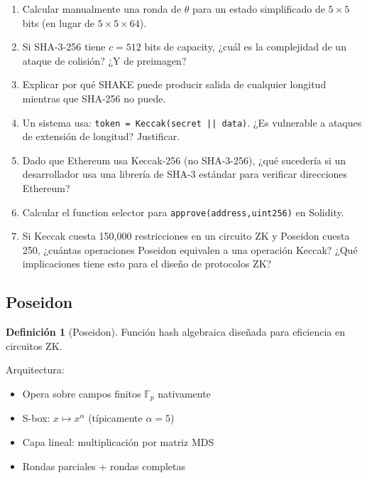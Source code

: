 \documentclass[11pt,a4paper,twoside,openright]{book}
\theoremstyle{definition}
\newtheorem{definition}{Definición}[chapter]
\theoremstyle{plain}
\theoremstyle{remark}
\newcommand{\Fp}{\mathbb{F}_p}
\begin{document}
\begin{enumerate}
    \item Calcular manualmente una ronda de $\theta$ para un estado simplificado de $5 \times 5$ bits (en lugar de $5 \times 5 \times 64$).
    
    \item Si SHA-3-256 tiene $c = 512$ bits de capacity, ¿cuál es la complejidad de un ataque de colisión? ¿Y de preimagen?
    
    \item Explicar por qué SHAKE puede producir salida de cualquier longitud mientras que SHA-256 no puede.
    
    \item Un sistema usa: \texttt{token = Keccak(secret || data)}. ¿Es vulnerable a ataques de extensión de longitud? Justificar.
    
    \item Dado que Ethereum usa Keccak-256 (no SHA-3-256), ¿qué sucedería si un desarrollador usa una librería de SHA-3 estándar para verificar direcciones Ethereum?
    
    \item Calcular el function selector para \texttt{approve(address,uint256)} en Solidity.
    
    \item Si Keccak cuesta 150,000 restricciones en un circuito ZK y Poseidon cuesta 250, ¿cuántas operaciones Poseidon equivalen a una operación Keccak? ¿Qué implicaciones tiene esto para el diseño de protocolos ZK?
\end{enumerate}



\subsection{Poseidon}

\begin{definition}[Poseidon]
Función hash algebraica diseñada para eficiencia en circuitos ZK.
\end{definition}

Arquitectura:
\begin{itemize}
    \item Opera sobre campos finitos $\Fp$ nativamente
    \item S-box: $x \mapsto x^\alpha$ (típicamente $\alpha = 5$)
    \item Capa lineal: multiplicación por matriz MDS
    \item Rondas parciales + rondas completas
\end{itemize}
\end{document}
